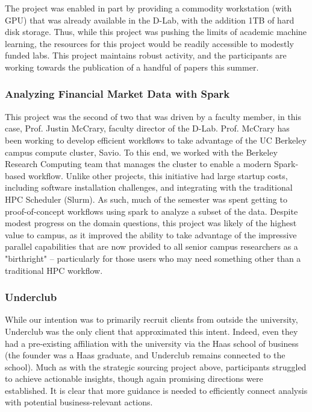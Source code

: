 \documentclass{sig-alternate}
\begin{document}
The project was enabled in part by providing a commodity workstation (with GPU) that was already available in the D-Lab, with the addition 1TB of hard disk storage. Thus, while this project was pushing the limits of academic machine learning, the resources for this project would be readily accessible to modestly funded labs. This project maintains robust activity, and the participants are working towards the publication of a handful of papers this summer.


\subsubsection*{Analyzing Financial Market Data with Spark}

This project was the second of two that was driven by a faculty member, in this case, Prof. Justin McCrary, faculty director of the D-Lab. Prof. McCrary has been working to develop efficient workflows to take advantage of the UC Berkeley campus compute cluster, Savio. To this end, we worked with the Berkeley Research Computing team that manages the cluster to enable a modern Spark-based workflow. Unlike other projects, this initiative had large startup costs, including software installation challenges, and integrating with the traditional HPC Scheduler (Slurm). As such, much of the semester was spent getting to proof-of-concept workflows using spark to analyze a subset of the data. Despite modest progress on the domain questions, this project was likely of the highest value to campus, as it improved the ability to take advantage of the impressive parallel capabilities that are now provided to all senior campus researchers as a "birthright" -- particularly for those users who may need something other than a traditional HPC workflow.

\subsubsection*{Underclub}

While our intention was to primarily recruit clients from outside the university, Underclub was the only client that approximated this intent. Indeed, even they had a pre-existing affiliation with the university via the Haas school of business (the founder was a Haas graduate, and Underclub remains connected to the school). Much as with the strategic sourcing project above, participants struggled to achieve actionable insights, though again promising directions were established. It is clear that more guidance is needed to efficiently connect analysis with potential business-relevant actions.
\end{document}
